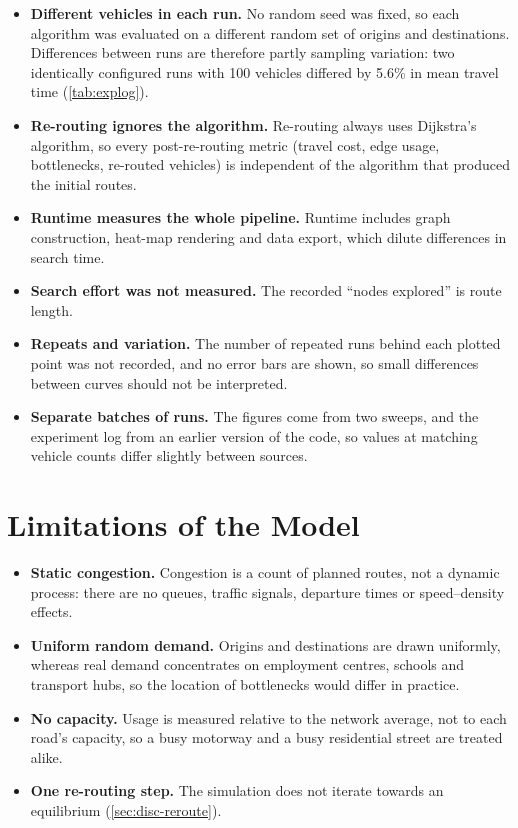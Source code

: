 \documentclass[12pt]{report}
\begin{document}
\begin{itemize}
  \item \textbf{Different vehicles in each run.} No random seed was fixed, so each algorithm was evaluated on a different random set of origins and destinations. Differences between runs are therefore partly sampling variation: two identically configured runs with 100 vehicles differed by 5.6\% in mean travel time (\cref{tab:explog}).
  \item \textbf{Re-routing ignores the algorithm.} Re-routing always uses Dijkstra's algorithm, so every post-re-routing metric (travel cost, edge usage, bottlenecks, re-routed vehicles) is independent of the algorithm that produced the initial routes.
  \item \textbf{Runtime measures the whole pipeline.} Runtime includes graph construction, heat-map rendering and data export, which dilute differences in search time.
  \item \textbf{Search effort was not measured.} The recorded ``nodes explored'' is route length.
  \item \textbf{Repeats and variation.} The number of repeated runs behind each plotted point was not recorded, and no error bars are shown, so small differences between curves should not be interpreted.
  \item \textbf{Separate batches of runs.} The figures come from two sweeps, and the experiment log from an earlier version of the code, so values at matching vehicle counts differ slightly between sources.
\end{itemize}

\section{Limitations of the Model}

\begin{itemize}
  \item \textbf{Static congestion.} Congestion is a count of planned routes, not a dynamic process: there are no queues, traffic signals, departure times or speed--density effects.
  \item \textbf{Uniform random demand.} Origins and destinations are drawn uniformly, whereas real demand concentrates on employment centres, schools and transport hubs, so the location of bottlenecks would differ in practice.
  \item \textbf{No capacity.} Usage is measured relative to the network average, not to each road's capacity, so a busy motorway and a busy residential street are treated alike.
  \item \textbf{One re-routing step.} The simulation does not iterate towards an equilibrium (\cref{sec:disc-reroute}).
\end{itemize}
\end{document}
